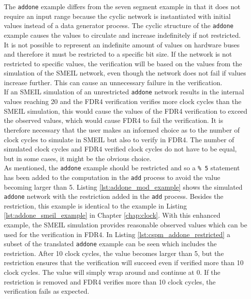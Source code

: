 The \texttt{addone} example differs from the seven segment example in that it does not require an input range because the cyclic network is instantiated with initial values instead of a data generator process. The cyclic structure of the \texttt{addone} example causes the values to circulate and increase indefinitely if not restricted. It is not possible to represent an indefinite amount of values on hardware buses and therefore it must be restricted to a specific bit size. If the network is not restricted to specific values, the verification will be based on the values from the simulation of the SMEIL network, even though the network does not fail if values increase further.  This can cause an unnecessary failure in the verification. \\

If an SMEIL simulation of an unrestricted \texttt{addone} network results in the internal values reaching 20 and the FDR4 verification verifies more clock cycles than the SMEIL simulation, this would cause the values of the FDR4 verification to exceed the observed values, which would cause FDR4 to fail the verification. It is therefore necessary that the user makes an informed choice as to the number of clock cycles to simulate in SMEIL but also to verify in FDR4. The number of simulated clock cycles and FDR4 verified clock cycles do not have to be equal, but in some cases, it might be the obvious choice. \\

As mentioned, the \texttt{addone} example should be restricted and so a \texttt{\% 5} statement has been added to the computation in the \texttt{add} process to avoid the value becoming larger than 5. Listing \ref{lst:addone_mod_example} shows the simulated \texttt{addone} network with the restriction added in the \texttt{add} process. Besides the restriction, this example is identical to the example in Listing \ref{lst:addone_smeil_example} in Chapter \ref{chap:clock}.
With this enhanced example, the SMEIL simulation provides reasonable observed values which can be used for the verification in FDR4. In Listing \ref{lst:cspm_addone_restricted} a subset of the translated \texttt{addone} example can be seen which includes the restriction.
After 10 clock cycles, the value becomes larger than 5, but the restriction ensures that the verification will succeed even if verified more than 10 clock cycles. The value will simply wrap around and continue at 0. If the restriction is removed and FDR4 verifies more than 10 clock cycles, the verification fails as expected. \\


